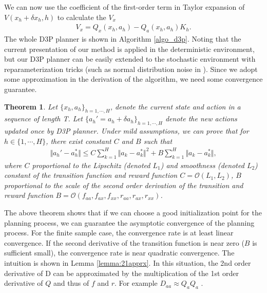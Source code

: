 \documentclass{article} %
\newtheorem{theorem}{Theorem}
\newcommand{\yue}[1]{ {#1}}
\begin{document}
We can now use the coefficient of the first-order term in  Taylor expansion of $V(x_h +\delta x_h , h)$ to calculate the $V_x$
\begin{align}\label{eq:v_x}
    V_x = Q_x(x_h, a_h) - Q_a(x_h, a_h)K_h .
\end{align}
The whole D3P planner is shown in Algorithm \ref{algo_d3p}. \yue{Noting that the current presentation of our method is applied in the deterministic environment, but our D3P planner can be easily extended to the stochastic environment with reparameterization tricks (such as normal distribution noise in \cite{kingma2013auto}). }
Since we adopt some approximation in the derivation of the algorithm, we need some convergence guarantee. 












\begin{theorem}\label{thm:d3p}
Let $\{x_h,a_h\}_{h=1,\cdots, H}$, denote the current state and action in a sequence of length T. Let $ \{a_h' = a_h  + \delta a_h\}_{h=1,\cdots, H}$ denote the new actions updated once by D3P planner. Under mild assumptions, we can prove that for $h \in \{1, \cdots , H\}$, there exist constant $C$ and $B$ such that
\begin{align}
   \Vert a_h' - a_h^* \Vert  \le C  \sum_{k=1}^H\Vert a_k  -a_k^* \Vert^2  + B \sum_{k=1}^H\Vert a_k  -a_k^* \Vert ,
\end{align}
where $C$ proportional to  the Lipschitz (denoted $L_1$) and smoothness (denoted $L_2$) constant of the transition function and reward function $C =  \mathcal{O}(L_1, L_2) $, $B$ proportional to the scale of the second order derivation  of the transition and reward function $B = \mathcal{O} (f_{aa},f_{ax},f_{xx}, r_{aa},r_{ax},r_{xx} )$.
\end{theorem}
 
The above theorem shows that if we can choose a good initialization point for the planning process, we can guarantee the asymptotic convergence of the planning process. For the finite sample case, the convergence rate is at least   linear convergence. If the second derivative of the transition function is near zero ($B$ is sufficient small),  the convergence rate is near quadratic convergence. The intuition is shown in Lemma \ref{lemma:21apprx}. In this situation, the 2nd order derivative of D can be approximated by the multiplication of the 1st order derivative of $Q$ and thus of $f$ and $r$. For example  $D_{aa} \approx Q_aQ_a$ .
 
\end{document}
